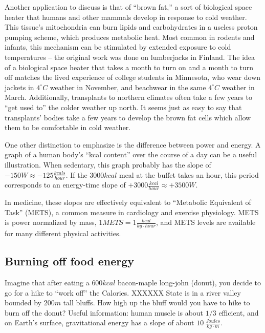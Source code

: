 \documentclass[prb,preprint]{revtex4-2}
\newcommand{\degC}{^{\circ}C}
\begin{document}
Another application to discuss is that of ``brown fat,'' a sort of biological space heater that humans and other mammals develop in response to cold weather.  This tissue's mitochondria can burn lipids and carbohydrates in a useless proton pumping scheme, which produces metabolic heat.\cite{brown_fat_1,brown_fat_2,brown_fat_3,brown_fat_4}  Most common in rodents and infants, this mechanism can be stimulated by extended exposure to cold temperatures -- the original work was done on lumberjacks in Finland.\cite{finland_lumberjacks}  
The idea of a biological space heater that takes a month to turn on and a month to turn off matches the lived experience of college students in Minnesota, who wear down jackets in $4\degC$ weather in November, and beachwear in the same $4\degC$ weather in March.  Additionally, transplants to northern climates often take a few years to ``get used to'' the colder weather up north. It seems just as easy to say that transplants' bodies take a few years to develop the brown fat cells which allow them to be comfortable in cold weather.

One other distinction to emphasize is the difference between power and energy.  A graph of a human body's ``kcal content'' over the course of a day can be a useful illustration.  When sedentary, this graph probably has the slope of $-150W\approx -125 \frac{kcals}{hour}$.  If the $3000kcal$ meal at the buffet takes an hour, this period corresponds to an energy-time slope of 
$+3000\frac{kcal}{hour}\approx +3500W$.  

In medicine, these slopes are effectively equivalent to ``Metabolic Equivalent of Task'' (METS), a common measure in cardiology and exercise physiology.  METS is power normalized by mass, $1METS=1\frac{kcal}{kg\cdot hour}$, and METS levels are available for many different physical activities.\cite{METS}

\subsection{Burning off food energy}
Imagine that after eating a $600kcal$ bacon-maple long-john (donut), you decide to go for a hike to ``work off'' the Calories.  
XXXXXX
State  is in a river valley bounded by $200m$ tall bluffs.  How high up the bluff would you have to hike to burn off the donut?  
Useful information: human muscle is about $1/3$ efficient, and on Earth's surface, gravitational energy has a slope of about $10~\frac{Joules}{kg\cdot m}$.
\end{document}
